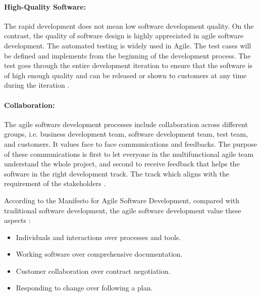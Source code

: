 \paragraph{High-Quality Software:} The rapid development does not mean low software development quality. On the contrast, the quality of software design is highly appreciated in agile software development. The automated testing is widely used in Agile. The test cases will be defined and implements from the beginning of the development process. The test goes through the entire development iteration to ensure that the software is of high enough quality and can be released or shown to customers at any time during the iteration \cite{Agilesof32:online}.
\paragraph{Collaboration:}
The agile software development processes include collaboration across different groups, i.e. business development team, software development team, test team, and customers. It values face to face communications \cite{beck2001principles} and feedbacks. The purpose of these communications is first to let everyone in the multifunctional agile team understand the whole project, and second to receive feedback that helps the software in the right development track. The track which aligns with the requirement of the stakeholders \cite{beck2001manifesto}. 
\par
According to the Manifesto for Agile Software Development, compared with traditional software development, the agile software development value these aspects \cite{beck2001manifesto}: 
\begin{itemize}
\item Individuals and interactions over processes and tools.
\item Working software over comprehensive documentation.
\item Customer collaboration over contract negotiation.
\item Responding to change over following a plan.
\end{itemize}
